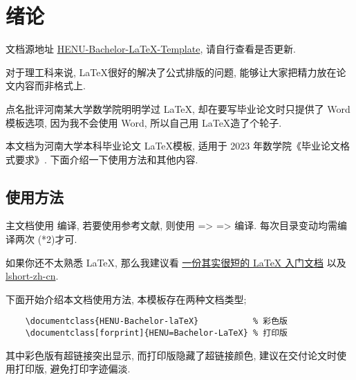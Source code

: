 \chapter{绪论}
文档源地址 \href{https://github.com/Icey-u/HENU-Bachelor-LaTeX-Template}{HENU-Bachelor-LaTeX-Template}, 请自行查看是否更新. 

对于理工科来说, \LaTeX 很好的解决了公式排版的问题, 能够让大家把精力放在论文内容而非格式上. 

点名批评河南某大学数学院明明学过 \LaTeX, 却在要写毕业论文时只提供了 Word 模板选项, 因为我不会使用 Word, 所以自己用 \LaTeX 造了个轮子.

本文档为河南大学本科毕业论文 \LaTeX 模板, 适用于 2023 年数学院《毕业论文格式要求》. 下面介绍一下使用方法和其他内容.
\section{使用方法}
主文档使用  编译, 若要使用参考文献, 则使用  =>  =>  编译. 每次目录变动均需编译两次 (*2)才可.

如果你还不太熟悉 \LaTeX, 那么我建议看 \href{https://liam.page/2014/09/08/latex-introduction/}{一份其实很短的 LaTeX 入门文档} 以及 \href{https://www.ctan.org/pkg/lshort-zh-cn}{lshort-zh-cn}.

下面开始介绍本文档使用方法, 本模板存在两种文档类型;
\begin{lstlisting}
    \documentclass{HENU-Bachelor-laTeX}           % 彩色版
    \documentclass[forprint]{HENU=Bachelor-LaTeX} % 打印版
\end{lstlisting}
其中彩色版有超链接突出显示, 而打印版隐藏了超链接颜色, 建议在交付论文时使用打印版, 避免打印字迹偏淡.